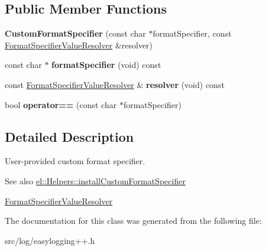 \subsection*{Public Member Functions}
\begin{DoxyCompactItemize}
\item 
{\bfseries Custom\+Format\+Specifier} (const char $\ast$format\+Specifier, const \hyperlink{namespaceel_ab3cd18425a11df166a041d9024b8b5c6}{Format\+Specifier\+Value\+Resolver} \&resolver)\hypertarget{classel_1_1CustomFormatSpecifier_a1d1bfa8b489d2908ee543023a51e58f6}{}\label{classel_1_1CustomFormatSpecifier_a1d1bfa8b489d2908ee543023a51e58f6}

\item 
const char $\ast$ {\bfseries format\+Specifier} (void) const \hypertarget{classel_1_1CustomFormatSpecifier_a0be00787b7ca1caedd32e1627d76fd24}{}\label{classel_1_1CustomFormatSpecifier_a0be00787b7ca1caedd32e1627d76fd24}

\item 
const \hyperlink{namespaceel_ab3cd18425a11df166a041d9024b8b5c6}{Format\+Specifier\+Value\+Resolver} \& {\bfseries resolver} (void) const \hypertarget{classel_1_1CustomFormatSpecifier_ac426e6771ae35e060313b8683b88adc8}{}\label{classel_1_1CustomFormatSpecifier_ac426e6771ae35e060313b8683b88adc8}

\item 
bool {\bfseries operator==} (const char $\ast$format\+Specifier)\hypertarget{classel_1_1CustomFormatSpecifier_ae17a9fbf8c5a28867308fcb8966a3aa0}{}\label{classel_1_1CustomFormatSpecifier_ae17a9fbf8c5a28867308fcb8966a3aa0}

\end{DoxyCompactItemize}


\subsection{Detailed Description}
User-\/provided custom format specifier. 

\begin{DoxySeeAlso}{See also}
\hyperlink{classel_1_1Helpers_aa6de15a09db4f2a6763a6652c0ea12b1}{el\+::\+Helpers\+::install\+Custom\+Format\+Specifier} 

\hyperlink{namespaceel_ab3cd18425a11df166a041d9024b8b5c6}{Format\+Specifier\+Value\+Resolver} 
\end{DoxySeeAlso}


The documentation for this class was generated from the following file\+:\begin{DoxyCompactItemize}
\item 
src/log/easylogging++.\+h\end{DoxyCompactItemize}
